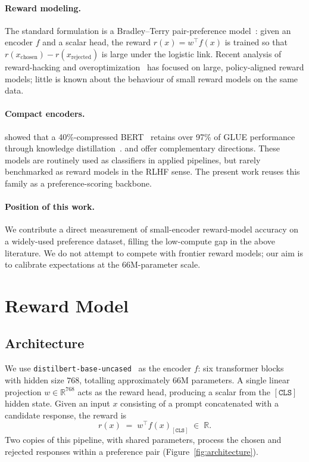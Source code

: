 \documentclass[11pt]{article}
\begin{document}
\paragraph{Reward modeling.} The standard formulation is a Bradley--Terry pair-preference model~\cite{bradley1952rank}: given an encoder $f$ and a scalar head, the reward $r(x) = w^\top f(x)$ is trained so that $r(x_{\text{chosen}}) - r(x_{\text{rejected}})$ is large under the logistic link. Recent analysis of reward-hacking and overoptimization~\cite{gao2023scaling} has focused on large, policy-aligned reward models; little is known about the behaviour of small reward models on the same data.

\paragraph{Compact encoders.} \citet{sanh2019distilbert} showed that a 40\%-compressed BERT~\cite{devlin2019bert} retains over 97\% of GLUE performance through knowledge distillation~\cite{hinton2015distillation}. \citet{lan2020albert} and \citet{liu2019roberta} offer complementary directions. These models are routinely used as classifiers in applied pipelines, but rarely benchmarked as reward models in the RLHF sense. The present work reuses this family as a preference-scoring backbone.

\paragraph{Position of this work.} We contribute a direct measurement of small-encoder reward-model accuracy on a widely-used preference dataset, filling the low-compute gap in the above literature. We do not attempt to compete with frontier reward models; our aim is to calibrate expectations at the 66M-parameter scale.

\section{Reward Model}
\label{sec:method}

\subsection{Architecture}
We use \texttt{distilbert-base-uncased}~\cite{sanh2019distilbert} as the encoder $f$: six transformer blocks~\cite{vaswani2017attention} with hidden size $768$, totalling approximately $66$M parameters. A single linear projection $w \in \mathbb{R}^{768}$ acts as the reward head, producing a scalar from the $\mathtt{[CLS]}$ hidden state. Given an input $x$ consisting of a prompt concatenated with a candidate response, the reward is
\begin{equation}
r(x) \;=\; w^{\top} f(x)_{\mathtt{[CLS]}} \;\in\; \mathbb{R}.
\end{equation}
Two copies of this pipeline, with shared parameters, process the chosen and rejected responses within a preference pair (Figure~\ref{fig:architecture}).
\end{document}

